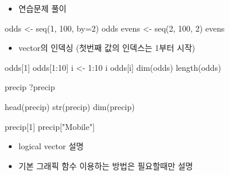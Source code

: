 \documentclass[
]{book}
\newenvironment{Shaded}{\begin{snugshade}}{\end{snugshade}}
\newcommand{\AttributeTok}[1]{\textcolor[rgb]{0.77,0.63,0.00}{#1}}
\newcommand{\DecValTok}[1]{\textcolor[rgb]{0.00,0.00,0.81}{#1}}
\newcommand{\FunctionTok}[1]{\textcolor[rgb]{0.00,0.00,0.00}{#1}}
\newcommand{\NormalTok}[1]{#1}
\newcommand{\OtherTok}[1]{\textcolor[rgb]{0.56,0.35,0.01}{#1}}
\newcommand{\SpecialCharTok}[1]{\textcolor[rgb]{0.00,0.00,0.00}{#1}}
\newcommand{\StringTok}[1]{\textcolor[rgb]{0.31,0.60,0.02}{#1}}
\providecommand{\tightlist}{%
  \setlength{\itemsep}{0pt}\setlength{\parskip}{0pt}}
\begin{document}
\begin{itemize}
\tightlist
\item
  연습문제 풀이
\end{itemize}

\begin{Shaded}
\begin{Highlighting}[]
\NormalTok{odds }\OtherTok{\textless{}{-}} \FunctionTok{seq}\NormalTok{(}\DecValTok{1}\NormalTok{, }\DecValTok{100}\NormalTok{, }\AttributeTok{by=}\DecValTok{2}\NormalTok{)}
\NormalTok{odds  }
\NormalTok{evens }\OtherTok{\textless{}{-}} \FunctionTok{seq}\NormalTok{(}\DecValTok{2}\NormalTok{, }\DecValTok{100}\NormalTok{, }\DecValTok{2}\NormalTok{)}
\NormalTok{evens}
\end{Highlighting}
\end{Shaded}

\begin{itemize}
\tightlist
\item
  vector의 인덱싱 (첫번째 값의 인덱스는 1부터 시작)
\end{itemize}

\begin{Shaded}
\begin{Highlighting}[]

\NormalTok{odds[}\DecValTok{1}\NormalTok{]}
\NormalTok{odds[}\DecValTok{1}\SpecialCharTok{:}\DecValTok{10}\NormalTok{]}
\NormalTok{i }\OtherTok{\textless{}{-}} \DecValTok{1}\SpecialCharTok{:}\DecValTok{10}
\NormalTok{i}
\NormalTok{odds[i]}
\FunctionTok{dim}\NormalTok{(odds)}
\FunctionTok{length}\NormalTok{(odds)}
\end{Highlighting}
\end{Shaded}

\begin{Shaded}
\begin{Highlighting}[]
\NormalTok{precip}
\NormalTok{?precip}

\FunctionTok{head}\NormalTok{(precip)}
\FunctionTok{str}\NormalTok{(precip)}
\FunctionTok{dim}\NormalTok{(precip)}

\NormalTok{precip[}\DecValTok{1}\NormalTok{]}
\NormalTok{precip[}\StringTok{"Mobile"}\NormalTok{]}
\end{Highlighting}
\end{Shaded}

\begin{itemize}
\tightlist
\item
  logical vector 설명
\item
  기본 그래픽 함수 이용하는 방법은 필요할때만 설명
\end{itemize}
\end{document}
